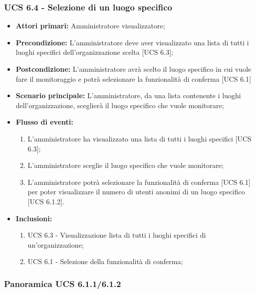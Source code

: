 \subsubsection{UCS 6.4 - Selezione di un luogo specifico}
\begin{itemize}
	\item \textbf{Attori primari:} Amministratore visualizzatore;
	\item \textbf{Precondizione:} L'amministratore deve aver visualizzato una lista di tutti i luoghi specifici dell'organizzazione scelta [UCS 6.3];
	\item \textbf{Postcondizione:} L'amministratore avrà scelto il luogo specifico in cui vuole fare il monitoraggio e potrà selezionare la funzionalità di conferma [UCS 6.1]
	\item \textbf{Scenario principale:} L'amministratore, da una lista contenente i luoghi dell'organizzazione, sceglierà il luogo specifico che vuole monitorare;
	\item \textbf{Flusso di eventi:} 
	\begin{enumerate}
		\item L'amministratore ha visualizzato una lista di tutti i luoghi specifici [UCS 6.3];
		\item L'amministratore sceglie il luogo specifico che vuole monitorare;
		\item L'amministratore potrà selezionare la funzionalità di conferma [UCS 6.1] per poter visualizzare il numero di utenti anonimi di un luogo specifico [UCS 6.1.2].
	\end{enumerate}
	\item \textbf{Inclusioni:}
	\begin{enumerate}
		\item UCS 6.3 - Visualizzazione lista di tutti i luoghi specifici di un'organizzazione;
		\item UCS 6.1 - Selezione della funzionalità di conferma;
	\end{enumerate}
\end{itemize}

\subsubsection{Panoramica UCS 6.1.1/6.1.2}

